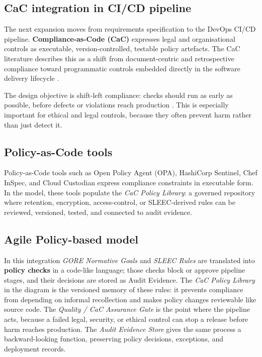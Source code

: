 \documentclass[11pt,a4paper]{article}
\begin{document}
\subsection{CaC integration in CI/CD pipeline}

The next expansion moves from requirements specification to the DevOps CI/CD pipeline. \textbf{Compliance-as-Code (CaC)} expresses legal and organisational controls as executable, version-controlled, testable policy artefacts. The CaC literature describes this as a shift from document-centric and retrospective compliance toward programmatic controls embedded directly in the software delivery lifecycle \cite[Secs.~2--4]{potharalanka_cac}.

The design objective is shift-left compliance: checks should run as early as possible, before defects or violations reach production \cite{cac}. This is especially important for ethical and legal controls, because they often prevent harm rather than just detect it.

\subsection{Policy-as-Code tools}

Policy-as-Code tools such as Open Policy Agent (OPA), HashiCorp Sentinel, Chef InSpec, and Cloud Custodian express compliance constraints in executable form. In the model, these tools populate the \textit{CaC Policy Library}: a governed repository where retention, encryption, access-control, or SLEEC-derived rules can be reviewed, versioned, tested, and connected to audit evidence.

\subsection{Agile Policy-based model}

In this integration \textit{GORE Normative Goals} and \textit{SLEEC Rules} are translated into \textbf{policy checks} in a code-like language; those checks block or approve pipeline stages, and their decisions are stored as Audit Evidence. The \textit{CaC Policy Library} in the diagram is the versioned memory of these rules: it prevents compliance from depending on informal recollection and makes policy changes reviewable like source code. The \textit{Quality / CaC Assurance Gate} is the point where the pipeline acts, because a failed legal, security, or ethical control can stop a release before harm reaches production. The \textit{Audit Evidence Store} gives the same process a backward-looking function, preserving policy decisions, exceptions, and deployment records.
\end{document}

